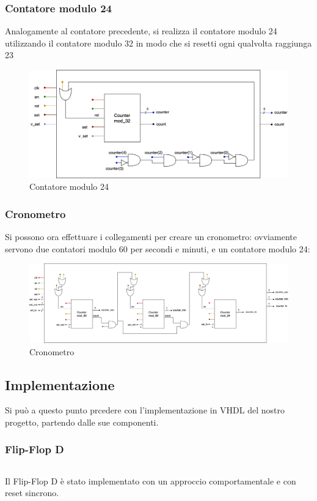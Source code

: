 \subsubsection{Contatore modulo 24}
Analogamente al contatore precedente, si realizza il contatore modulo 24 utilizzando il contatore modulo 32 in modo che si resetti ogni qualvolta raggiunga 23
\begin{figure}[H]
	\centering
	\includegraphics[width=1\textwidth]{img/counter_mod_24.png}
	\caption{Contatore modulo 24}
	\label{cnt_60} 
\end{figure}

\subsubsection{Cronometro}
Si possono ora effettuare i collegamenti per creare un cronometro: ovviamente servono due contatori modulo 60 per secondi e minuti, e un contatore modulo 24:
\begin{figure}[H]
	\centering
	\includegraphics[width=1\textwidth]{img/stopwatch.png}
	\caption{Cronometro}
	\label{stpwth} 
\end{figure}

\subsection{Implementazione}
Si può a questo punto prcedere con l'implementazione in VHDL del nostro progetto, partendo dalle sue componenti.
\subsubsection{Flip-Flop D}
\begin{code}
    \inputminted[frame=lines, framesep=2mm, baselinestretch=1.2, bgcolor=LightGray, fontsize=\footnotesize, linenos]{vhdl}{vhdl_files/Esercizio_5.1/ffD.vhdl}
    \caption{ffD.vhdl}
    \label{lst:ffD}
\end{code}
Il Flip-Flop D è stato implementato con un approccio comportamentale e con reset sincrono.

